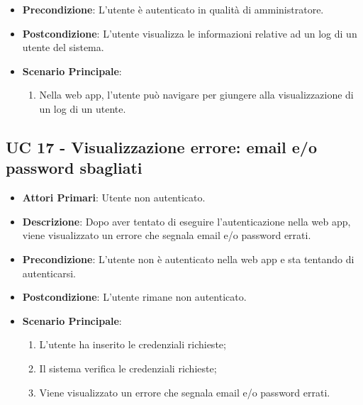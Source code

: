 \begin{itemize}
			\item \textbf{Precondizione}: L'utente è autenticato in qualità di amministratore.
			\item \textbf{Postcondizione}: L'utente visualizza le informazioni relative ad un log di un utente del sistema.
			\item \textbf{Scenario Principale}:
			\begin{enumerate}
				\item Nella web app, l'utente può navigare per giungere alla visualizzazione di un log di un utente.
			\end{enumerate}	
		\end{itemize}
		


		


		


		 


		\subsection{UC 17 - Visualizzazione errore: email e/o password sbagliati}
		\begin{itemize}
			\item \textbf{Attori Primari}: Utente non autenticato.
			\item \textbf{Descrizione}: Dopo aver tentato di eseguire l'autenticazione nella web app, viene visualizzato un errore che segnala email e/o password errati.
			\item \textbf{Precondizione}: L'utente non è autenticato nella web app e sta tentando di autenticarsi.
			\item \textbf{Postcondizione}: L'utente rimane non autenticato.
			\item \textbf{Scenario Principale}:
			\begin{enumerate}
				\item L'utente ha inserito le credenziali richieste;
				\item Il sistema verifica le credenziali richieste;
				\item Viene visualizzato un errore che segnala email e/o password errati.
			\end{enumerate}
		\end{itemize}

